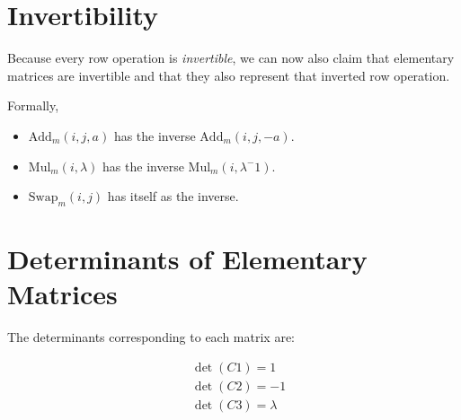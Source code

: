 \section{Invertibility}

Because every row operation is \emph{invertible}, we can now also claim that elementary matrices are invertible and that they also represent 
that inverted row operation.

Formally, 

\begin{itemize}
    
    \item \(\text{Add}_m (i, j, a)\) has the inverse \(\text{Add}_m (i, j, - a)\).

    \item \(\text{Mul}_m (i,\lambda)\) has the inverse \(\text{Mul}_m (i,\lambda^-1)\).
    
    \item \(\text{Swap}_m (i,j)\) has itself as the inverse.

\end{itemize}

\section{Determinants of Elementary Matrices}

The determinants corresponding to each matrix are:

\begin{align*}
     & \det(C1) = 1       \\
     & \det(C2) = -1      \\
     & \det(C3) = \lambda
\end{align*}

